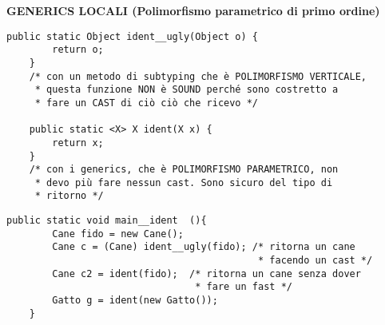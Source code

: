 \noindent \textbf{GENERICS LOCALI (Polimorfismo parametrico di primo ordine)} 

\begin{lstlisting}[basicstyle=\small,]
    public static Object ident__ugly(Object o) {
        return o;
    }   
    /* con un metodo di subtyping che è POLIMORFISMO VERTICALE, 
     * questa funzione NON è SOUND perché sono costretto a 
     * fare un CAST di ciò ciò che ricevo */

    public static <X> X ident(X x) {
        return x;
    }   
    /* con i generics, che è POLIMORFISMO PARAMETRICO, non
     * devo più fare nessun cast. Sono sicuro del tipo di
     * ritorno */
\end{lstlisting}

\begin{lstlisting}[basicstyle=\small,]
	public static void main__ident	(){
		Cane fido = new Cane();
		Cane c = (Cane) ident__ugly(fido); /* ritorna un cane 
											* facendo un cast */
		Cane c2 = ident(fido);  /* ritorna un cane senza dover 
								 * fare un fast */ 
		Gatto g = ident(new Gatto());
	}
\end{lstlisting}





















